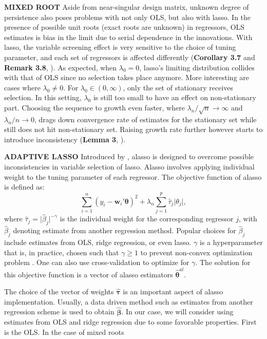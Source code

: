 \documentclass[12pt,a4paper]{article}
\DeclareMathOperator*{\argmin}{arg\,min} %
\begin{document}
\textbf{MIXED ROOT} Aside from near-singular design matrix, unknown degree of persistence also poses problems with not only OLS, but also with lasso. In the presence of possible unit roots (exact roots are unknown) in regressors, OLS estimates is bias in the limit due to serial dependence in the innovations. With lasso, the variable screening effect is very sensitive to the choice of tuning parameter, and each set of regressors is affected differently (\textbf{Corollary 3.7} and \textbf{Remark 3.8}, \cite{lee2018lasso}). As expected, when $ \lambda_0 = 0 $, lasso's limiting distribution collides with that of OLS since no selection takes place anymore. More interesting are cases where $ \lambda_0 \neq 0 $. For $ \lambda_0 \in (0, \infty) $, only the set of stationary receives selection. In this setting, $ \lambda_0 $ is still too small to have an effect on non-stationary part. Choosing the sequence to growth even faster, where  $ \lambda_n/\sqrt{n} \rightarrow \infty $ and $ \lambda_n/n \rightarrow 0 $, drags down convergence rate of estimates for the stationary set while still does not hit non-stationary set. Raising growth rate further however starts to introduce inconsistency (\textbf{Lemma 3}, \cite{zou2006adaptive}).

\textbf{ADAPTIVE LASSO} Introduced by \cite{zou2006adaptive}, alasso is designed to overcome possible inconsistencies in variable selection of lasso. Alasso involves applying individual weight to the tuning parameter of each regressor. The objective function of alasso is defined as:
\begin{equation}\label{eq:7}
	\sum_{i = 1}^n(y_i - \bm{w}_i'\bm{\theta})^2 + 
	\lambda_n\sum_{j = 1}^p \hat{\tau}_j \vert\theta_j\vert,
\end{equation}
where $ \hat{\tau}_j = \vert\hat{\beta}_j\vert^{-\gamma} $ is the individual weight for the corresponding regressor $ j $, with $ \hat{\beta}_j $ denoting estimate from another regression method. Popular choices for $ \hat{\beta}_j $ include estimates from OLS, ridge regression, or even lasso. $ \gamma $ is a hyperparameter that is, in practice, chosen such that $ \gamma \geq 1 $ to prevent non-convex optimization problem \citep{lee2018lasso}. One can also use cross-validation to optimize for $ \gamma $. The solution for this objective function is a vector of alasso estimators $ \hat{\bm{\theta}}^{al} $.

The choice of the vector of weights $ \hat{\bm{\tau}} $ is an important aspect of alasso implementation. Usually, a data driven method such as estimates from another regression scheme is used to obtain $ \hat{\bm{\beta}}$. In our case, we will consider using estimates from OLS and ridge regression due to some favorable properties. First is the OLS. In the case of mixed roots
\end{document}
